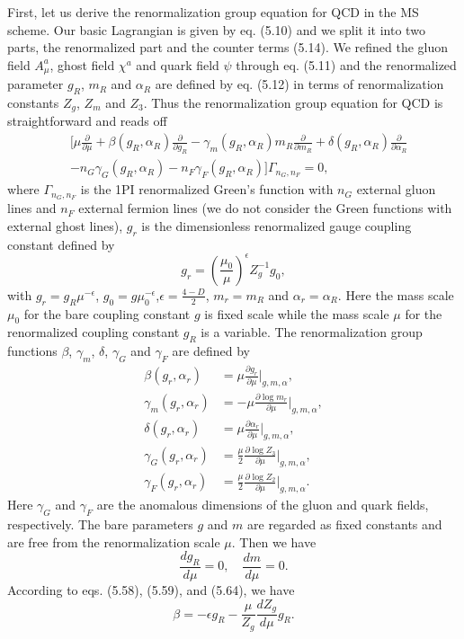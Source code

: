 First, let us derive the renormalization group equation for QCD in the MS scheme. Our basic Lagrangian is given by eq. (5.10) and we split it into two parts, the renormalized part and the counter terms (5.14). We refined the gluon field $A^a_\mu$, ghost field $\chi^a$ and quark field $\psi$ through eq. (5.11) and the renormalized parameter $g_R$, $m_R$ and $\alpha_R$ are defined by eq. (5.12) in terms of renormalization constants $Z_g$, $Z_m$ and $Z_3$. Thus the renormalization group equation for QCD is straightforward and reads off
\begin{align}
&\biggl[ \mu\frac{\partial}{\partial\mu}+\beta(g_R,\alpha_R)\frac{\partial}{\partial g_R}-\gamma_m(g_R,\alpha_R) m_R\frac{\partial}{\partial m_R}+\delta(g_R,\alpha_R)\frac{\partial}{\partial \alpha_R}\nonumber\\
&-n_G\gamma_G(g_R,\alpha_R)-n_F\gamma_F(g_R,\alpha_R) \biggr]\Gamma_{n_G,n_F}=0,
\end{align}
where $\Gamma_{n_G,n_F}$ is the 1PI renormalized Green's function with $n_G$ external gluon lines and $n_F$ external fermion lines (we do not consider the Green functions with external ghost lines), $g_r$ is the dimensionless renormalized gauge coupling constant defined by
\begin{equation}
g_r=\left( \frac{\mu_0}{\mu} \right)^\epsilon Z^{-1}_g
g_0,
\end{equation}
with $g_r=g_R\mu^{-\epsilon}$, $g_0=g\mu_0^{-\epsilon}$,$\epsilon=\frac{4-D}{2}$, $m_r=m_R$ and 
$\alpha_r=\alpha_R$. Here the mass scale $\mu_0$ for the bare coupling constant $g$ is fixed scale while the mass scale $\mu$ for the renormalized coupling constant $g_R$ is a variable. The renormalization group functions $\beta$, $\gamma_m$, $\delta$, $\gamma_G$ and $\gamma_F$ are defined by
\begin{align}
\beta(g_r,\alpha_r)&=\mu\frac{\partial g_r}{\partial \mu}\bigg|_{g,m,\alpha},\\
\gamma_m(g_r,\alpha_r)&=-\mu\frac{\partial\log m_r}{\partial\mu}\bigg|_{g,m,\alpha},\\
\delta(g_r,\alpha_r)&=\mu\frac{\partial\alpha_r}{\partial\mu}\bigg|_{g,m,\alpha},\\
\gamma_G(g_r,\alpha_r)&=\frac{\mu}{2}\frac{\partial\log Z_3}{\partial\mu}\bigg|_{g,m,\alpha},\\
\gamma_F(g_r,\alpha_r)&=\frac{\mu}{2}\frac{\partial\log Z_2}{\partial\mu}\bigg|_{g,m,\alpha}.
\end{align}
Here $\gamma_G$ and $\gamma_F$ are the anomalous dimensions of the gluon and quark fields, respectively. The bare parameters $g$ and $m$ are regarded as fixed constants and are free from the renormalization scale $\mu$. Then we have
\begin{equation}
\frac{dg_R}{d\mu}=0,\quad \frac{dm}{d\mu}=0.
\end{equation}
According to eqs. (5.58), (5.59), and (5.64), we have 
\begin{equation}
\beta=-\epsilon g_R-\frac{\mu}{Z_g}\frac{dZ_g}{d\mu}g_R.
\end{equation}

